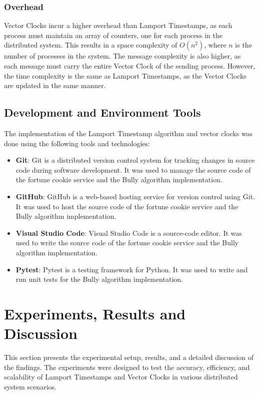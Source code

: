 \documentclass{article}
\begin{document}
    \subsubsection{Overhead}
    Vector Clocks incur a higher overhead than Lamport Timestamps, as each process must maintain an array of counters, one for each process in the distributed system. This results in a space complexity of $O(n^2)$, where $n$ is the number of processes in the system. The message complexity is also higher, as each message must carry the entire Vector Clock of the sending process. However, the time complexity is the same as Lamport Timestamps, as the Vector Clocks are updated in the same manner.

  \subsection{Development and Environment Tools}
    The implementation of the Lamport Timestamp algorithm and vector clocks was done using the following tools and technologies:
    \begin{itemize}
        \item \textbf{Git}: Git is a distributed version control system for tracking changes in source code during software development. It was used to manage the source code of the fortune cookie service and the Bully algorithm implementation.
        \item \textbf{GitHub}: GitHub is a web-based hosting service for version control using Git. It was used to host the source code of the fortune cookie service and the Bully algorithm implementation.
        \item \textbf{Visual Studio Code}: Visual Studio Code is a source-code editor. It was used to write the source code of the fortune cookie service and the Bully algorithm implementation.
        \item \textbf{Pytest}: Pytest is a testing framework for Python. It was used to write and run unit tests for the Bully algorithm implementation.
      \end{itemize}

\section{Experiments, Results and Discussion}
  This section presents the experimental setup, results, and a detailed discussion of the findings. The experiments were designed to test the accuracy, efficiency, and scalability of Lamport Timestamps and Vector Clocks in various distributed system scenarios.
\end{document}
